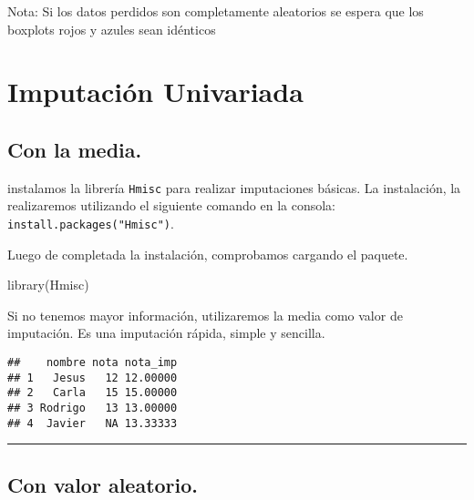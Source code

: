 \documentclass[
]{article}
\newenvironment{Shaded}{\begin{snugshade}}{\end{snugshade}}
\newcommand{\FunctionTok}[1]{\textcolor[rgb]{0.00,0.00,0.00}{#1}}
\newcommand{\NormalTok}[1]{#1}
\newcommand{\OtherTok}[1]{\textcolor[rgb]{0.56,0.35,0.01}{#1}}
\newcommand{\SpecialCharTok}[1]{\textcolor[rgb]{0.00,0.00,0.00}{#1}}
\begin{document}
Nota: Si los datos perdidos son completamente aleatorios se espera que
los boxplots rojos y azules sean idénticos

\newpage

\hypertarget{imputaciuxf3n-univariada}{%
\section{Imputación Univariada}\label{imputaciuxf3n-univariada}}

\hypertarget{con-la-media.}{%
\subsection{Con la media.}\label{con-la-media.}}

instalamos la librería \texttt{Hmisc} para realizar imputaciones
básicas. La instalación, la realizaremos utilizando el siguiente comando
en la consola: \texttt{install.packages("Hmisc")}.

Luego de completada la instalación, comprobamos cargando el paquete.

\begin{Shaded}
\begin{Highlighting}[]
\FunctionTok{library}\NormalTok{(Hmisc)}
\end{Highlighting}
\end{Shaded}

Si no tenemos mayor información, utilizaremos la media como valor de
imputación. Es una imputación rápida, simple y sencilla.

\begin{Shaded}
\end{Shaded}

\begin{verbatim}
##    nombre nota nota_imp
## 1   Jesus   12 12.00000
## 2   Carla   15 15.00000
## 3 Rodrigo   13 13.00000
## 4  Javier   NA 13.33333
\end{verbatim}

\begin{center}\rule{0.5\linewidth}{0.5pt}\end{center}

\hypertarget{con-valor-aleatorio.}{%
\subsection{Con valor aleatorio.}\label{con-valor-aleatorio.}}
\end{document}
